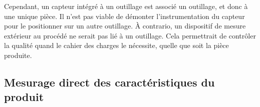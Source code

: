 Cependant, un capteur intégré à un outillage est associé un outillage, et donc à une unique pièce.
Il n'est pas viable de démonter l'instrumentation du capteur pour le positionner sur un autre outillage.
À contrario, un dispositif de mesure extérieur au procédé ne serait pas lié à un outillage.
Cela permettrait de contrôler la qualité quand le cahier des charges le nécessite, quelle que soit la pièce produite.


\subsection{Mesurage direct des caractéristiques du produit}
%
